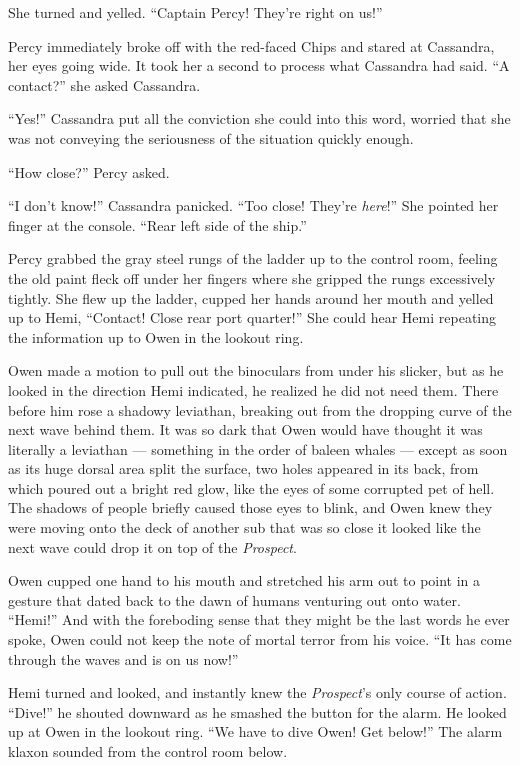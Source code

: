 \documentclass[
]{scrbook}
\begin{document}
She turned and yelled. ``Captain Percy! They're right on us!''

Percy immediately broke off with the red-faced Chips and stared at
Cassandra, her eyes going wide. It took her a second to process what
Cassandra had said. ``A contact?'' she asked Cassandra.

``Yes!'' Cassandra put all the conviction she could into this word,
worried that she was not conveying the seriousness of the situation
quickly enough.

``How close?'' Percy asked.

``I don't know!'' Cassandra panicked. ``Too close! They're
\emph{here}!'' She pointed her finger at the console. ``Rear left side
of the ship.''

Percy grabbed the gray steel rungs of the ladder up to the control room,
feeling the old paint fleck off under her fingers where she gripped the
rungs excessively tightly. She flew up the ladder, cupped her hands
around her mouth and yelled up to Hemi, ``Contact! Close rear port
quarter!'' She could hear Hemi repeating the information up to Owen in
the lookout ring.

Owen made a motion to pull out the binoculars from under his slicker,
but as he looked in the direction Hemi indicated, he realized he did not
need them. There before him rose a shadowy leviathan, breaking out from
the dropping curve of the next wave behind them. It was so dark that
Owen would have thought it was literally a leviathan --- something in
the order of baleen whales --- except as soon as its huge dorsal area
split the surface, two holes appeared in its back, from which poured out
a bright red glow, like the eyes of some corrupted pet of hell. The
shadows of people briefly caused those eyes to blink, and Owen knew they
were moving onto the deck of another sub that was so close it looked
like the next wave could drop it on top of the \emph{Prospect}.

Owen cupped one hand to his mouth and stretched his arm out to point in
a gesture that dated back to the dawn of humans venturing out onto
water. ``Hemi!'' And with the foreboding sense that they might be the
last words he ever spoke, Owen could not keep the note of mortal terror
from his voice. ``It has come through the waves and is on us now!''

Hemi turned and looked, and instantly knew the \emph{Prospect}'s only
course of action. ``Dive!'' he shouted downward as he smashed the button
for the alarm. He looked up at Owen in the lookout ring. ``We have to
dive Owen! Get below!'' The alarm klaxon sounded from the control room
below.
\end{document}
